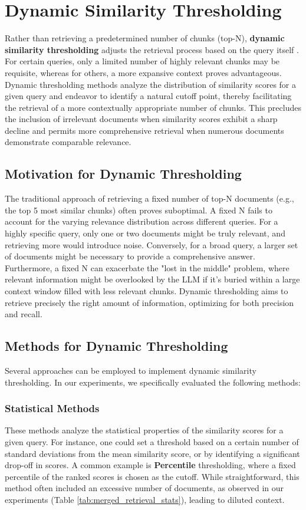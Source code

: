 \section{Dynamic Similarity Thresholding}
Rather than retrieving a predetermined number of chunks (top-N), \textbf{dynamic similarity thresholding} adjusts the retrieval process based on the query itself \autocite{lee2021adaptive}. For certain queries, only a limited number of highly relevant chunks may be requisite, whereas for others, a more expansive context proves advantageous. Dynamic thresholding methods analyze the distribution of similarity scores for a given query and endeavor to identify a natural cutoff point, thereby facilitating the retrieval of a more contextually appropriate number of chunks. This precludes the inclusion of irrelevant documents when similarity scores exhibit a sharp decline and permits more comprehensive retrieval when numerous documents demonstrate comparable relevance.

\subsection{Motivation for Dynamic Thresholding}
The traditional approach of retrieving a fixed number of top-N documents (e.g., the top 5 most similar chunks) often proves suboptimal. A fixed N fails to account for the varying relevance distribution across different queries. For a highly specific query, only one or two documents might be truly relevant, and retrieving more would introduce noise. Conversely, for a broad query, a larger set of documents might be necessary to provide a comprehensive answer. Furthermore, a fixed N can exacerbate the "lost in the middle" problem, where relevant information might be overlooked by the LLM if it's buried within a large context window filled with less relevant chunks. Dynamic thresholding aims to retrieve precisely the right amount of information, optimizing for both precision and recall.

\subsection{Methods for Dynamic Thresholding}
Several approaches can be employed to implement dynamic similarity thresholding. In our experiments, we specifically evaluated the following methods:

\subsubsection{Statistical Methods}
These methods analyze the statistical properties of the similarity scores for a given query. For instance, one could set a threshold based on a certain number of standard deviations from the mean similarity score, or by identifying a significant drop-off in scores. A common example is \textbf{Percentile} thresholding, where a fixed percentile of the ranked scores is chosen as the cutoff. While straightforward, this method often included an excessive number of documents, as observed in our experiments (Table \ref{tab:merged_retrieval_stats}), leading to diluted context.

